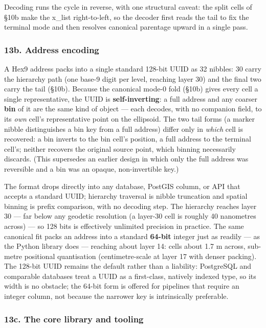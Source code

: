 \documentclass[
  11pt,
  a4paper,
]{article}
\begin{document}
Decoding runs the cycle in reverse, with one structural caveat: the
split cells of §10b make the x\_list right-to-left, so the decoder first
reads the tail to fix the terminal mode and then resolves canonical
parentage upward in a single pass.

\subsubsection{13b. Address encoding}\label{b.-address-encoding}

A Hex9 address packs into a single standard 128-bit UUID as 32 nibbles:
30 carry the hierarchy path (one base-9 digit per level, reaching layer
30) and the final two carry the tail (§10b). Because the canonical
mode-0 fold (§10b) gives every cell a single representative, the UUID is
\textbf{self-inverting}: a full address and any coarser \textbf{bin} of
it are the same kind of object --- each decodes, with no companion
field, to its \emph{own} cell's representative point on the ellipsoid.
The two tail forms (a marker nibble distinguishes a bin key from a full
address) differ only in \emph{which} cell is recovered: a bin inverts to
the bin cell's position, a full address to the terminal cell's; neither
recovers the original source point, which binning necessarily discards.
(This supersedes an earlier design in which only the full address was
reversible and a bin was an opaque, non-invertible key.)

The format drops directly into any database, PostGIS column, or API that
accepts a standard UUID; hierarchy traversal is nibble truncation and
spatial binning is prefix comparison, with no decoding step. The
hierarchy reaches layer 30 --- far below any geodetic resolution (a
layer-30 cell is roughly 40 nanometres across) --- so 128 bits is
effectively unlimited precision in practice. The same canonical fit
packs an address into a standard \textbf{64-bit} integer just as readily
--- as the Python library does --- reaching about layer 14: cells about
1.7 m across, sub-metre positional quantisation (centimetre-scale at
layer 17 with denser packing). The 128-bit UUID remains the default
rather than a liability: PostgreSQL and comparable databases treat a
UUID as a first-class, natively indexed type, so its width is no
obstacle; the 64-bit form is offered for pipelines that require an
integer column, not because the narrower key is intrinsically
preferable.

\subsubsection{13c. The core library and
tooling}\label{c.-the-core-library-and-tooling}
\end{document}
